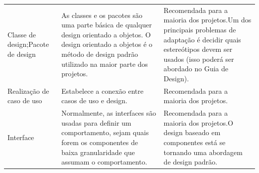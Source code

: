 \begin{table}[]
\begin{tabular}{lll}
Classe de design;Pacote de design                  & As classes e os pacotes são uma parte básica de qualquer design orientado a objetos. O design orientado a objetos é o método de design padrão utilizado na maior parte dos projetos.                                                                                                                                                                                                                              & Recomendada para a maioria dos projetos.Um dos principais problemas de adaptação é decidir quais estereótipos devem ser usados (isso poderá ser abordado no Guia de Design).                                                                                                                                                                                                     \\
Realização de caso de uso                          & Estabelece a conexão entre casos de uso e design.                                                                                                                                                                                                                                                                                                                                                                 & Recomendada para a maioria dos projetos.                                                                                                                                                                                                                                                                                                                                         \\
Interface                                          & Normalmente, as interfaces são usadas para definir um comportamento, sejam quais forem os componentes de baixa granularidade que assumam o comportamento.                                                                                                                                                                                                                                                         & Recomendada para a maioria dos projetos.O design baseado em componentes está se tornando uma abordagem de design padrão.                                                                                                                                                                                                                                                         \\

\end{tabular}
\end{table}
